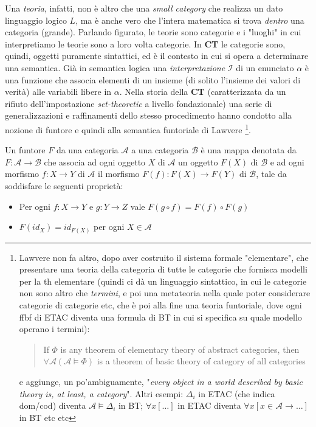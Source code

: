 \documentclass[a4paper, 11pt]{article}
\begin{document}
Una \emph{teoria}, infatti, non è altro che una \emph{small category} che realizza  un dato linguaggio logico $L$, ma è anche vero che l'intera matematica si trova \emph{dentro} una categoria (grande). Parlando figurato, le teorie sono categorie e i "luoghi" in cui interpretiamo le teorie sono a loro volta categorie. In \textbf{CT} le categorie sono, quindi, oggetti puramente sintattici, ed è il contesto in cui si opera a determinare una semantica. Già in semantica logica una \emph{interpretazione} $\mathcal{I}$ di un enunciato $\alpha$ è una funzione che associa elementi di un insieme (di solito l'insieme dei valori di verità) alle variabili libere in $\alpha$. Nella storia della \textbf{CT} (caratterizzata da un rifiuto dell'impostazione \emph{set-theoretic} a livello fondazionale) una serie di generalizzazioni e raffinamenti dello stesso procedimento hanno condotto alla nozione di funtore e quindi alla semantica funtoriale di Lawvere \footnote{Lawvere non fa altro, dopo aver costruito il sistema formale "elementare", che presentare una teoria della categoria di tutte le categorie che fornisca modelli per la th elementare (quindi ci dà un linguaggio sintattico, in cui le categorie non sono altro che \emph{termini}, e poi una metateoria nella quale poter considerare categorie di categorie etc, che è poi alla fine una teoria funtoriale, dove ogni ffbf di ETAC diventa una formula di BT in cui si specifica su quale modello operano i termini):
\begin{quotation}
	If $\Phi$ is any theorem of elementary theory of abstract categories, then $ \forall \mathcal{A} (\mathcal{A} \models \Phi)$ is a theorem of basic theory of category of all categories
\end{quotation}
e aggiunge, un po'ambiguamente, "\textit{every object in a world described by basic theory is, at least, a category}". Altri esempi: $\Delta_i$ in ETAC (che indica dom/cod) diventa $\mathcal{A} \models \Delta_i$ in BT; $\forall x [\dots]$ in ETAC diventa $\forall x [x \in \mathcal{A} \rightarrow \dots]$ in BT etc etc}. 

Un funtore $F$ da una categoria $\mathcal{A}$ a una categoria $\mathcal{B}$ è una mappa denotata da $F: \mathcal{A} \to \mathcal{B}$ che associa ad ogni oggetto $X$ di $\mathcal{A}$ un oggetto $F(X)$ di $\mathcal{B}$ e ad ogni morfismo $f: X \to Y$ di $\mathcal{A}$ il morfismo $F(f): F(X) \to F(Y)$ di $\mathcal{B}$, tale da soddisfare le seguenti proprietà:
\begin{itemize}
	\item Per ogni $f: X \to Y$ e $g: Y \to Z$ vale $F(g \circ f)= F(f) \circ F(g)$
	\item $F(id_X) = id_{F(X)}$ per ogni $X \in \mathcal{A}$
\end{itemize}
\end{document}
